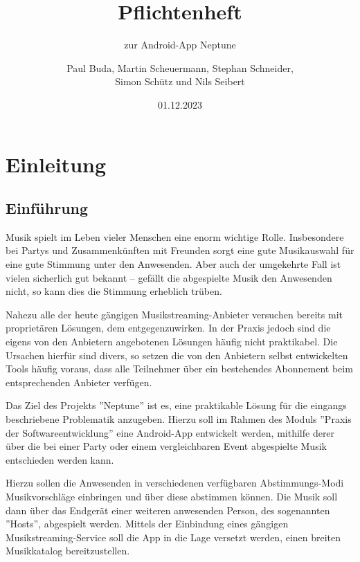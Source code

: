 \documentclass[oneside, ngerman]{sdqtechreport}
\author{Paul Buda, Martin Scheuermann, Stephan Schneider, \\
Simon Schütz und Nils Seibert}
\title{Pflichtenheft}
\subtitle{zur Android-App Neptune}
\date{01.12.2023}
\begin{document}
\setpdf

\maketitle

\tableofcontents

\cleardoublepage


\chapter{Einleitung}
\label{chap:Einleitung}

\section{Einführung}
\label{sec:Einleitung:Einführung}
Musik spielt im Leben vieler Menschen eine enorm wichtige Rolle. Insbesondere bei Partys und Zusammenkünften mit Freunden sorgt eine gute Musikauswahl für eine gute Stimmung unter den Anwesenden. Aber auch der umgekehrte Fall ist vielen sicherlich gut bekannt – gefällt die abgespielte Musik den Anwesenden nicht, so kann dies die Stimmung erheblich trüben.

Nahezu alle der heute gängigen Musikstreaming-Anbieter versuchen bereits mit proprietären Lösungen, dem entgegenzuwirken. In der Praxis jedoch sind die eigens von den Anbietern angebotenen Lösungen häufig nicht praktikabel. Die Ursachen hierfür sind divers, so setzen die von den Anbietern selbst entwickelten Tools häufig voraus, dass alle Teilnehmer über ein bestehendes Abonnement beim entsprechenden Anbieter verfügen. 

Das Ziel des Projekts ''Neptune'' ist es, eine praktikable Lösung für die eingangs beschriebene Problematik anzugeben. Hierzu soll im Rahmen des Moduls ''Praxis der Softwareentwicklung'' eine Android-App entwickelt werden, mithilfe derer über die bei einer Party oder einem vergleichbaren Event abgespielte Musik entschieden werden kann.

Hierzu sollen die Anwesenden in verschiedenen verfügbaren Abstimmungs-Modi Musikvorschläge einbringen und über diese abstimmen können. Die Musik soll dann über das Endgerät einer weiteren anwesenden Person, des sogenannten ''Hosts'', abgespielt werden. 
Mittels der Einbindung eines gängigen Musikstreaming-Service soll die App in die Lage versetzt werden, einen breiten Musikkatalog bereitzustellen.
\end{document}
